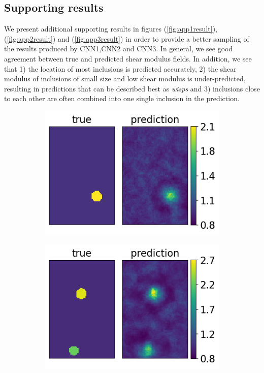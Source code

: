 \documentclass[12pt]{article}
\newcommand{\nhgappwidth}{0.24\linewidth}
\newcommand{\nhgappheight}{2.9cm}
\begin{document}
\clearpage
\newpage
\begin{appendices}
\section{\label{sect:appendix1} Supporting results}
We present additional supporting results in figures (\ref{fig:app1result}),(\ref{fig:app2result}) and (\ref{fig:app3result}) in order to provide a better sampling of the results produced by CNN1,CNN2 and CNN3. In general, we see good agreement between true and predicted shear modulus fields. In addition, we see that 1) the location of most inclusions is predicted accurately, 2) the shear modulus of inclusions of small size and low shear modulus is under-predicted, resulting in predictions that can be described best as \textit{wisps} and 3) inclusions close to each other are often combined into one single inclusion in the prediction. 
\begin{figure}[!h]
  \centering
  \begin{subfigure}[c]{\nhgappwidth}
    \centering    
    \includegraphics[totalheight=\nhgappheight]{Figures/AppendixNew/CNN1/ex5/mu.png}
  \end{subfigure}
  \begin{subfigure}[c]{\nhgappwidth}
    \centering    
    \includegraphics[totalheight=\nhgappheight]{Figures/AppendixNew/CNN1/ex6/mu.png}

\end{subfigure}
\end{figure}
\end{appendices}
\end{document}
